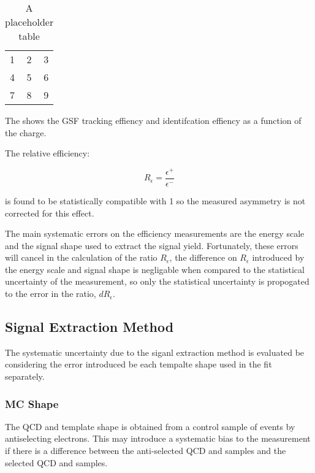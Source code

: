 \begin{table}[htb]
  \centering
  \begin{tabular}{| l c r |}
    \hline
    1 & 2 & 3 \\
    4 & 5 & 6 \\
    7 & 8 & 9 \\
  \hline
  \end{tabular}
  \caption{A placeholder table}
  \label{asym36:tagprobe}
\end{table}

The  shows the GSF tracking effiency and identifcation 
effiency as a function of the charge.

The relative efficiency: 

\begin{equation}
R_\epsilon  =  \frac{\epsilon^+}{\epsilon^-}
\end{equation}

is found to be statistically compatible with 1 so the measured asymmetry is not
corrected for this effect.

The main systematic errors on the efficiency measurements are the energy scale
and the signal shape used to extract the signal yield. Fortunately, these
errors will cancel in the calculation of the ratio $R_\epsilon$, the difference
on  $R_\epsilon$ introduced by the energy scale and signal shape is negligable
when compared to the statistical uncertainty of the measurement, so only the
statistical uncertainty is propogated to the error in the ratio,
$dR_\epsilon$.

\subsection{Signal Extraction Method}

The systematic uncertainty due to the siganl extraction method is evaluated be
considering the error introduced be each \ETm tempalte shape used in the fit
separately.

\subsubsection{\ac{MC} \ETm Shape}

The \ac{QCD} and \gjet \ETm template shape is obtained from a control sample of
events by antiselecting electrons. This may introduce a systematic bias to the
measurement if there is a difference between the anti-selected \ac{QCD} and \gjet
\ETm samples and the selected \ac{QCD} and \gjet samples.

